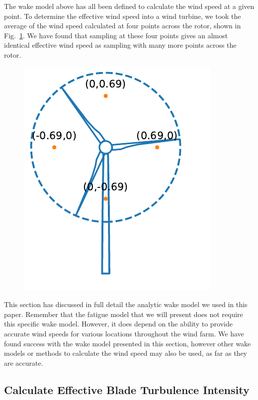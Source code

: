 \documentclass[11pt,letterpaper]{article}
\begin{document}
The wake model above has all been defined to calculate the wind speed at a given point. To determine the effective wind speed into a wind turbine, we took the average of the wind speed calculated at four points across the rotor, shown in Fig.~\ref{speed_samples}. We have found that sampling at these four points gives an almost identical effective wind speed as sampling with many more points across the rotor.
% 
\begin{figure}
    \centering
    \hspace*{0.7cm} 
    \includegraphics[]{images/rotor_samples_1.pdf}
    \caption{}
    \label{speed_samples}
\end{figure}

This section has discussed in full detail the analytic wake model we used in this paper. Remember that the fatigue model that we will present does not require this specific wake model. However, it does depend on the ability to provide accurate wind speeds for various locations throughout the wind farm. We have found success with the wake model presented in this section, however other wake models or methods to calculate the wind speed may also be used, as far as they are accurate. 

\subsection{Calculate Effective Blade Turbulence Intensity}
\label{sec:TI}
\end{document}
